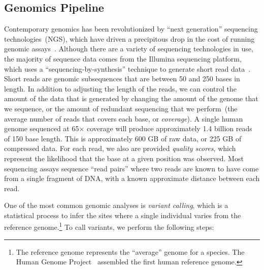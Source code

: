 \documentclass{sig-alternate}
\begin{document}
\subsection{Genomics Pipeline}
\label{sec:genomics-pipeline}

Contemporary genomics has been revolutionized by ``next generation'' sequencing
technologies~(NGS), which have \linebreak driven a precipitous drop in the cost of running genomic
assays~\cite{nhgri}. Although there are a variety of sequencing technologies in use, the majority of
sequence data comes from the Illumina sequencing platform, which uses a ``sequencing-by-synthesis''
technique to generate short read data~\cite{metzker09}. Short reads are genomic subsequences that
are between 50 and 250 bases in length. In addition to
adjusting the length of the reads, we can control the amount of the data that is generated by
changing the amount of the genome that we sequence, or the amount of redundant sequencing that
we perform~(the average number of reads that covers each base, or \emph{coverage}). A single
human genome sequenced at 65$\times$ coverage will produce approximately 1.4 billion reads of 150 base length.
This is approximately 600 GB of raw data, or 225 GB of compressed data. For each read, we also
are provided \emph{quality scores}, which represent the likelihood that the base at a given position
was observed. Most sequencing assays sequence ``read pairs'' where two reads are known to have
come from a single fragment of DNA, with a known approximate distance between each read.

One of the most common genomic analyses is \emph{variant calling}, which is a statistical process to
infer the sites where a single individual varies from the reference genome.\footnote{The
reference genome represents the ``average'' genome for a species. The Human Genome
Project~\cite{lander01} assembled the first human reference genome.} To call variants, we perform the
following steps:
\end{document}

